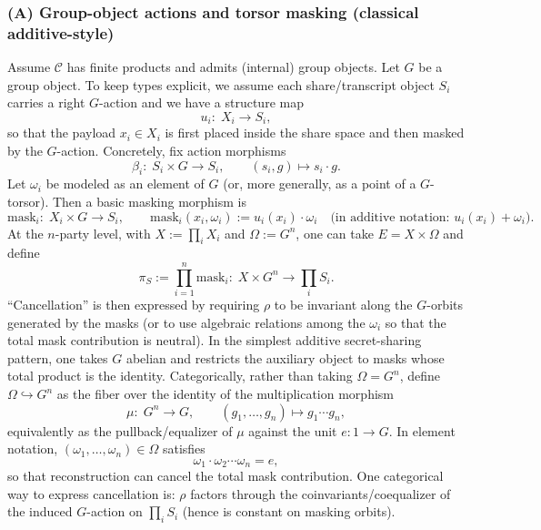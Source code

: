 \documentclass[11pt,a4paper]{article}
\theoremstyle{definition}
\theoremstyle{plain}
\begin{document}
\subsubsection{(A) Group-object actions and torsor masking (classical additive-style)}
\label{subsubsec:combine-cancel-group}
Assume $\mathcal{C}$ has finite products and admits (internal) group objects.
Let $G$ be a group object.
To keep types explicit, we assume each share/transcript object $S_i$ carries a right $G$-action and we have a structure map
\[
u_i:\; X_i \longrightarrow S_i,
\]
so that the payload $x_i\in X_i$ is first placed inside the share space and then masked by the $G$-action.
Concretely, fix action morphisms
\[
\beta_i:\; S_i\times G \longrightarrow S_i,
\qquad
(s_i,g)\longmapsto s_i\cdot g.
\]
Let $\omega_i$ be modeled as an element of $G$ (or, more generally, as a point of a $G$-torsor).
Then a basic masking morphism is
\[
\mathrm{mask}_i:\; X_i\times G \longrightarrow S_i,
\qquad
\mathrm{mask}_i(x_i,\omega_i):=u_i(x_i)\cdot \omega_i
\quad\text{(in additive notation: }u_i(x_i)+\omega_i\text{)}.
\]
At the $n$-party level, with $X:=\prod_i X_i$ and $\Omega:=G^n$, one can take $E=X\times \Omega$ and define
\[
\pi_S:=\prod_{i=1}^n \mathrm{mask}_i:\; X\times G^n \longrightarrow \prod_i S_i.
\]
``Cancellation'' is then expressed by requiring $\rho$ to be invariant along the $G$-orbits generated by the masks (or to use algebraic relations among the $\omega_i$ so that the total mask contribution is neutral).
In the simplest additive secret-sharing pattern, one takes $G$ abelian and restricts the auxiliary object to masks whose total product is the identity.
Categorically, rather than taking $\Omega=G^n$, define $\Omega\hookrightarrow G^n$ as the fiber over the identity of the multiplication morphism
\[
\mu:\; G^n \longrightarrow G,
\qquad
(g_1,\dots,g_n)\longmapsto g_1\cdots g_n,
\]
equivalently as the pullback/equalizer of $\mu$ against the unit $e:1\to G$.
In element notation, $(\omega_1,\dots,\omega_n)\in\Omega$ satisfies
\[
\omega_1\cdot \omega_2\cdots \omega_n = e,
\]
so that reconstruction can cancel the total mask contribution.
One categorical way to express cancellation is: $\rho$ factors through the coinvariants/coequalizer of the induced $G$-action on $\prod_i S_i$ (hence is constant on masking orbits).
\end{document}
